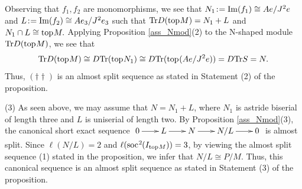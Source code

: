\documentclass[10pt]{amsart}
\theoremstyle{definition}
\newcommand{\soc}{{\rm soc}\hspace{.5pt}}
\newcommand{\ntop}{{\rm top}\hspace{.5pt}}
\newcommand{\hp}{\hspace{.5pt}}
\begin{document}
Observing that $f_1, f_2$ are monomorphisms, we see that $N_1\!:\hp ={\rm Im}(f_1)\cong Ae/J^2e$ and $L\!:\hp ={\rm Im}(f_2)\cong Ae_3/J^2e_3$ such that ${\rm Tr}D(\ntop M)=N_1+L$ and $N_1\cap L\cong \ntop M.$ Applying Proposition \ref{ass_Nmod}(2) to the N-shaped module ${\rm Tr}D(\ntop M)$, we see that \vspace{-2.2pt}
$${\rm Tr}D(\ntop M)\cong D{\rm Tr}(\ntop N_1)\cong D{\rm Tr}(\ntop(Ae/J^2e))= D{\rm Tr}S=N.\vspace{-3.5pt}$$ Thus, $(\dagger\dagger)$ is an almost split sequence as stated in Statement (2) of the proposition.

(3) As seen above, we may assume that $N=N_1+L$, where $N_1$ is astride biserial of length three and $L$ is uniserial of length two. \vspace{-1pt} By Proposition \ref{ass_Nmod}(3), the canonical short exact sequence $\xymatrixcolsep{20pt}\xymatrix{0\ar[r] & L\ar[r] & N\ar[r] & N/ L\ar[r] & 0} \vspace{-2pt}$ is almost split. Since $\ell(N/L)=2$ and $\ell(\soc^2\hspace{-.5pt}(I_{\ntop M}))=3$, by viewing the almost split sequence (1) stated in the proposition, we infer that $N/L\cong P/M$. Thus, this canonical sequence is an almost split sequence as stated in Statement (3) of the proposition.
\end{document}
